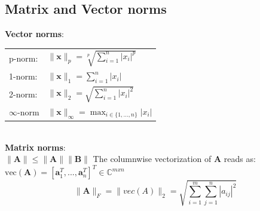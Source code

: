 \documentclass[english]{latex4ei/latex4ei_sheet}
\begin{document}
\begin{sectionbox}
\subsection{Matrix and Vector norms}
\textbf{Vector norms}:\\

\begin{tabular*}{\columnwidth}{ll}
	p-norm: & $\parallel\mathbf{x}\parallel_p = \sqrt[p]{\sum_{i=1}^{n} |x_i|^p}$\\
	1-norm: & $\parallel\mathbf{x}\parallel_1 = \sum_{i=1}^{n} |x_i|$\\
	2-norm: & $\parallel\mathbf{x}\parallel_2 = \sqrt{\sum_{i=1}^{n} |x_i|^2}$\\
	$\infty$-norm & $\parallel\mathbf{x}\parallel_\infty = \max_{i\in\{1,...,n\}} |x_i|$\\
\end{tabular*}\\

\textbf{Matrix norms}:\\
$\parallel \mathbf{A}\parallel \leq \parallel \mathbf{A}\parallel \parallel\mathbf{B}\parallel$
The columnwise vectorization of $\mathbf{A}$ reads as:\\
$\text{vec}(\mathbf{A}) = [\mathbf{a}_1^T, ...,\mathbf{a}_n^T]^T\in\mathbb{C}^{mxn}$\\

$$\parallel\mathbf{A}\parallel_F = \parallel vec(A)\parallel_2 = \sqrt{\sum_{i=1}^{m}\sum_{j=1}^{n} |a_{ij}|^2}$$
\end{sectionbox}
\end{document}
